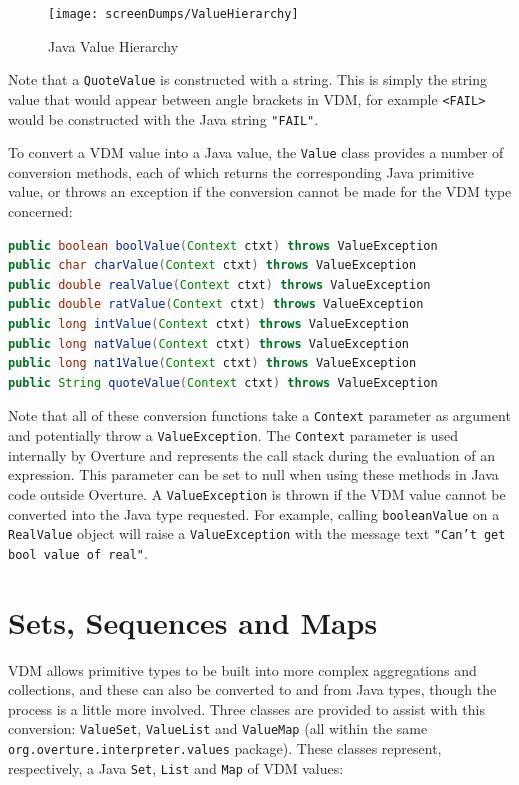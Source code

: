 \documentclass{overturerepchap}
\newcommand{\url}[1]{\texttt{#1}}
\begin{document}
\begin{figure}[h]
\begin{center}
  \texttt{[image: screenDumps/ValueHierarchy]}
  \caption[labelInTOC]{Java Value Hierarchy}
  \label{fig:gui:JavaVDMhierarchy}
\end{center}
\end{figure}

Note that a \texttt{QuoteValue} is constructed with a string. This is simply the string value that would appear between angle brackets in VDM, for example \texttt{<FAIL>} would be constructed with the Java string \texttt{"FAIL"}.

To convert a VDM value into a Java value, the \texttt{Value} class provides a number of conversion methods, each of which returns the corresponding Java primitive value, or throws an exception if the conversion cannot be made for the VDM type concerned:

\begin{lstlisting}[language=JAVA]
public boolean boolValue(Context ctxt) throws ValueException
public char charValue(Context ctxt) throws ValueException
public double realValue(Context ctxt) throws ValueException
public double ratValue(Context ctxt) throws ValueException
public long intValue(Context ctxt) throws ValueException
public long natValue(Context ctxt) throws ValueException
public long nat1Value(Context ctxt) throws ValueException
public String quoteValue(Context ctxt) throws ValueException
\end{lstlisting}

Note that all of these conversion functions take a \texttt{Context} parameter as argument and potentially throw a \texttt{ValueException}. The \texttt{Context} parameter is used internally by Overture and represents the call stack during the evaluation of an expression. This parameter can be set to null when using these methods in Java code outside Overture. A \texttt{ValueException} is thrown if the VDM value cannot be converted into the Java type requested. For example, calling \texttt{booleanValue} on a \texttt{RealValue} object will raise a \texttt{ValueException} with the message text \texttt{"Can't get bool value of real"}.

\section{Sets, Sequences and Maps}

VDM allows primitive types to be built into more complex aggregations and collections, and these can also be converted to and from Java types, though the process is a little more involved. Three classes are provided to assist with this conversion: \texttt{ValueSet}, \texttt{ValueList} and \texttt{ValueMap} (all within the same  \url{org.overture.interpreter.values} package). These classes represent, respectively, a Java \texttt{Set}, \texttt{List} and \texttt{Map} of VDM values:
\end{document}
